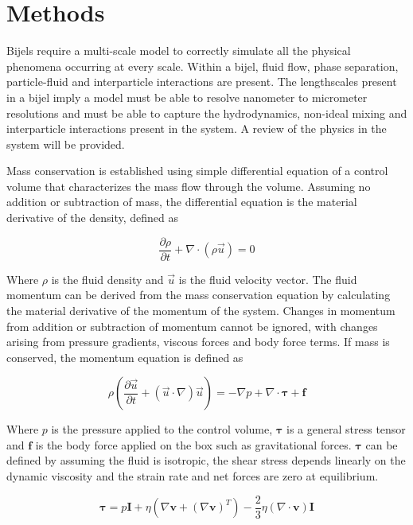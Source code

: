 \section{Methods}
\label{section:methods}

Bijels require a multi-scale model to correctly simulate all the physical phenomena occurring at every scale. Within a bijel, fluid flow,
phase separation, particle-fluid and interparticle interactions are present. The lengthscales present in a bijel imply a model must be able
to resolve nanometer to micrometer resolutions and must be able to capture the hydrodynamics, non-ideal mixing and interparticle interactions present
in the system. A review of the physics in the system will be provided. 

Mass conservation is established using simple differential equation of a control volume that characterizes the mass flow through the volume. Assuming no
addition or subtraction of mass, the differential equation is the material derivative of the density, defined as

\begin{equation}
    \frac{\partial\rho}{\partial t} + \nabla\cdot\left(\rho\vec{u}\right) = 0
\end{equation}

Where $\rho$ is the fluid density and $\vec{u}$ is the fluid velocity vector. The fluid momentum can be derived from the mass conservation equation
by calculating the material derivative of the momentum of the system. Changes in momentum from addition or subtraction of momentum cannot be ignored,
with changes arising from pressure gradients, viscous forces and body force terms. If mass is conserved, the momentum equation is defined as

\begin{equation}
    \rho (\frac{\partial\vec{u}}{\partial t} + (\vec{u}\cdot\nabla)\vec{u}) = -\nabla p + \nabla \cdot \mathbf{\tau} + \mathbf{f}
\end{equation}

Where $p$ is the pressure applied to the control volume, $\mathbf{\tau}$ is a general stress tensor and $\mathbf{f}$ is the body force 
applied on the box such as gravitational forces. $\mathbf{\tau}$ can be defined by assuming the fluid is isotropic, the shear stress depends
linearly on the dynamic viscosity and the strain rate and net forces are zero at equilibrium.

\begin{equation}
    \mathbf{\tau} = p\mathbf{I} + \eta(\nabla \mathbf{v} + (\nabla \mathbf{v})^T) - \frac{2}{3}\eta(\nabla \cdot \mathbf{v})\mathbf{I}
\end{equation}

